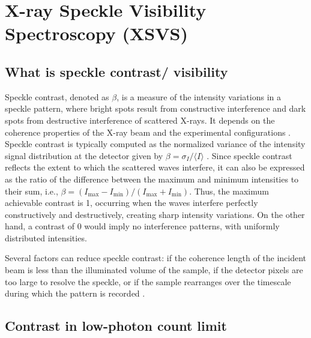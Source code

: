 \documentclass[11pt]{article}
\theoremstyle{definition}
\begin{document}
\section{X-ray Speckle Visibility Spectroscopy (XSVS)}
\subsection{What is speckle contrast/ visibility}
\label{subsec:speckle}
Speckle contrast, denoted as $\beta$, is a measure of the intensity variations in a speckle pattern, where bright spots result from constructive interference and dark spots from destructive interference of scattered X-rays. It depends on the coherence properties of the X-ray beam and the experimental configurations \cite{hruszkewycz_high_2012}. Speckle contrast is typically computed as the normalized variance of the intensity signal distribution at the detector given by $\beta = \sigma_I/\langle I \rangle$ \cite{hruszkewycz_high_2012}. Since speckle contrast reflects the extent to which the scattered waves interfere, it can also be expressed as the ratio of the difference between the maximum and minimum intensities to their sum, i.e., \(\beta = (I_{\text{max}} - I_{\text{min}})/( I_{\text{max}} + I_{\text{min}})\). Thus, the maximum achievable contrast is 1, occurring when the waves interfere perfectly constructively and destructively, creating sharp intensity variations. On the other hand, a contrast of 0 would imply no interference patterns, with uniformly distributed intensities. 

Several factors can reduce speckle contrast: if the coherence length of the incident beam is less than the illuminated volume of the sample, if the detector pixels are too large to resolve the speckle, or if the sample rearranges over the timescale during which the pattern is recorded \cite{hruszkewycz_high_2012}. 

\subsection{Contrast in low-photon count limit}
\end{document}
